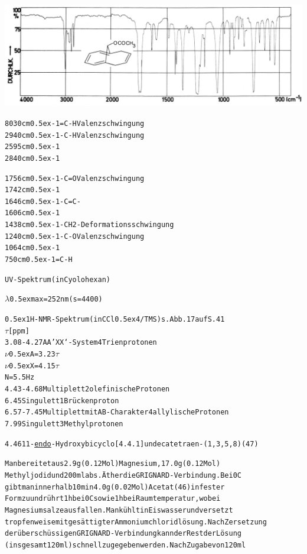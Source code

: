 \documentclass[a4paper,11pt]{article}
\begin{document}
\hspace*{-0.5cm}\includegraphics[width=14.97cm]{IR_043}
\begin{alltt}

8030 cm\raise0.5ex\hbox{-1} =C-H Valenzschwingung
2940 cm\raise0.5ex\hbox{-1} -C-H Valenzschwingung
2595 cm\raise0.5ex\hbox{-1}
2840 cm\raise0.5ex\hbox{-1}

\newpage
{}


1756 cm\raise0.5ex\hbox{-1} -C=O Valenzschwingung
1742 cm\raise0.5ex\hbox{-1}
1646 cm\raise0.5ex\hbox{-1} -C=C-
1606 cm\raise0.5ex\hbox{-1}
1438 cm\raise0.5ex\hbox{-1} -CH2- Deformationsschwingung
1240 cm\raise0.5ex\hbox{-1} -C-O Valenzschwingung
1064 cm\raise0.5ex\hbox{-1}
 750 cm\raise0.5ex\hbox{-1} =C-H

UV-Spektrum (in Cyolohexan)

\(\lambda\)\lower0.5ex\hbox{max} = 252 nm (s = 4400)


\leavevmode\raise0.5ex\hbox{1}H-NMR-Spektrum (in CCl\lower0.5ex\hbox{4}/TMS) s. Abb. 17 auf S. 41
  \(\tau\) [ppm]
3.08 - 4.27 AA'XX‘-System                4 Trienprotonen
            \(\nu\)\lower0.5ex\hbox{A} = 3.23\(\tau\)
            \(\nu\)\lower0.5ex\hbox{X} = 4.15\(\tau\)
            N = 5.5 Hz
4.43 - 4.68 Multiplett                   2 olefinische Protonen
6.45        Singulett                    1 Brückenproton
6.57 - 7.45 Multiplett mit AB-Charakter  4 allylische Protonen
7.99        Singulett 3 Methylprotonen


4.46 11-\underline{endo}-Hydroxybicyclo[4.4.1]undecatetraen-(1‚3,5,8) (47)

Man bereitet aus 2.9 g (0.12 Mol) Magnesium, 17.0 g (0.12 Mol)
Methyljodid und 200 ml abs. Äther die GRIGNARD-Verbindung. Bei 0\degree{}C
gibt man innerhalb 10 min 4.0 g (0.02 Mol) Acetat (46) in fester
Form zu und rührt 1 h bei 0\degree{}C sowie 1 h bei Raumtemperatur, wobei
Magnesiumsalze ausfallen. Man kühlt in Eiswasser und versetzt
tropfenweise mit gesättigter Ammoniumchloridlösung. Nach Zersetzung
der überschüssigen GRIGNARD-Verbindung kann der Rest der Lösung
(insgesamt 120 ml) schnell zugegeben werden. Nach Zugabe von 120 ml


\end{alltt}
\end{document}
